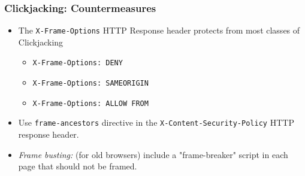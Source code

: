\documentclass{beamer}
\begin{document}
\begin{frame}[fragile]\frametitle{Clickjacking: Countermeasures}
\begin{itemize}\itemsep=1.5ex
\item The \lstinline|X-Frame-Options| HTTP Response header protects from most classes of Clickjacking
\begin{itemize}
\item \lstinline|X-Frame-Options: DENY|
\item \lstinline|X-Frame-Options: SAMEORIGIN|
\item \lstinline|X-Frame-Options: ALLOW FROM|
\end{itemize}
\item Use \lstinline|frame-ancestors| directive in the \lstinline|X-Content-Security-Policy| HTTP response header.
\item \emph{Frame busting:} (for old browsers) include a "frame-breaker" script in each page that should not be framed. 
\end{itemize}


\end{frame}
\end{document}

